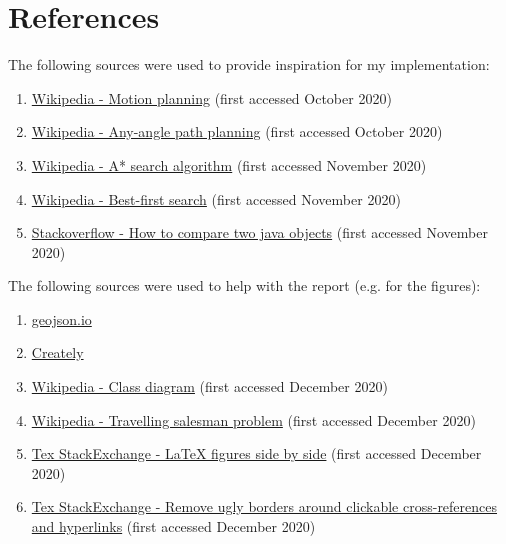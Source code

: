 \documentclass[11pt]{article}
\begin{document}
\newpage
\section{References}
The following sources were used to provide inspiration for my implementation:
\begin{enumerate}
    \item \href{https://en.wikipedia.org/wiki/Motion_planning#Grid-based_search}{Wikipedia - Motion planning} (first accessed October 2020)
    \item \href{https://en.wikipedia.org/wiki/Any-angle_path_planning}{Wikipedia - Any-angle path planning} (first accessed October 2020)
    \item \href{https://en.wikipedia.org/wiki/A*_search_algorithm#}{Wikipedia - A* search algorithm} (first accessed November 2020)
    \item \href{https://en.wikipedia.org/wiki/Best-first_search}{Wikipedia - Best-first search} (first accessed November 2020)
    \item \href{https://stackoverflow.com/questions/16069106/how-to-compare-two-java-objects}{Stackoverflow - How to compare two java objects} (first accessed November 2020)
\end{enumerate}

The following sources were used to help with the report (e.g. for the figures):
\begin{enumerate}
    \item \href{https://geojson.io}{geojson.io}
    \item \href{https://creately.com/}{Creately}
    \item \href{https://en.wikipedia.org/wiki/Class_diagram#Dependency}{Wikipedia - Class diagram} (first accessed December 2020)
    \item \href{https://en.wikipedia.org/wiki/Travelling_salesman_problem}{Wikipedia - Travelling salesman problem} (first accessed December 2020)
    \item \href{https://tex.stackexchange.com/questions/37581/latex-figures-side-by-side#37597}{Tex StackExchange - LaTeX figures side by side} (first accessed December 2020)
    \item \href{https://tex.stackexchange.com/a/847}{Tex StackExchange - Remove ugly borders around clickable cross-references and hyperlinks} (first accessed December 2020)
\end{enumerate}
\end{document}
